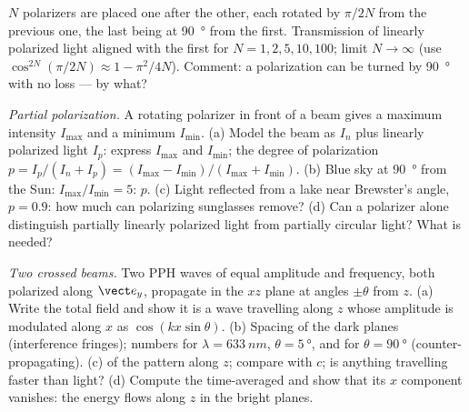 \begin{exercise}[$\star\star$]\label{exo:b2:plane-waves-polarization:8}
$N$ polarizers are placed one after the other, each rotated by
$\pi/2N$ from the previous one, the last being at \qty{90}{\degree} from the
first. Transmission of linearly polarized light aligned with the first
for $N = 1, 2, 5, 10, 100$; limit $N \to \infty$ (use $\cos^{2N}(\pi/2N) \approx
1 - \pi^2/4N$). Comment: a polarization can be turned by \qty{90}{\degree}
with no loss --- by what?
\end{exercise}

\begin{exercise}[$\star\star$]\label{exo:b2:plane-waves-polarization:9}
\emph{Partial polarization.} A rotating polarizer in front of a beam
gives a maximum intensity $I_{\max}$ and a minimum $I_{\min}$. (a) Model the
beam as  $I_n$ plus linearly polarized light $I_p$: express
$I_{\max}$ and $I_{\min}$; the degree of polarization $p = I_p/(I_n + I_p) =
(I_{\max} - I_{\min})/(I_{\max} + I_{\min})$. (b) Blue sky at \qty{90}{\degree} from
the Sun: $I_{\max}/I_{\min} = 5$: $p$. (c) Light reflected from a lake near
Brewster's angle, $p = 0.9$: how much can polarizing sunglasses remove?
(d) Can a polarizer alone distinguish partially linearly polarized
light from partially circular light? What is needed?
\end{exercise}

\begin{exercise}[$\star\star\star$]\label{exo:b2:plane-waves-polarization:10}
\emph{Two crossed beams.} Two PPH waves of equal amplitude and
frequency, both polarized along $\vect e_y$, propagate in the $xz$ plane
at angles $\pm\theta$ from $z$. (a) Write the total field and show it is a
wave travelling along $z$ whose amplitude is modulated along $x$ as
$\cos(kx\sin\theta)$. (b) Spacing of the dark planes (interference
fringes); numbers for $\lambda = \qty{633}{nm}$, $\theta = \qty{5}{\degree}$, and for
$\theta = \qty{90}{\degree}$ (counter-propagating). (c)  of the
pattern along $z$; compare with $c$; is anything travelling faster than
light? (d) Compute the time-averaged  and show that its
$x$ component vanishes: the energy flows along $z$ in the bright
planes.
\end{exercise}

